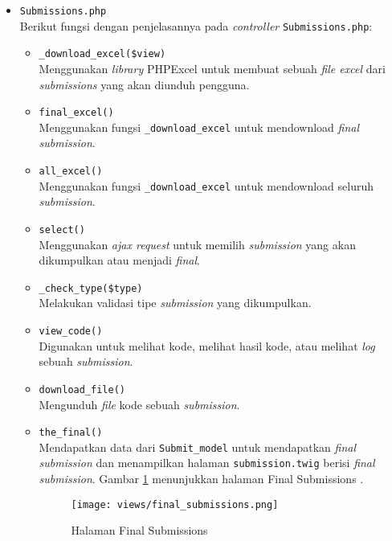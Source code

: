 \begin{itemize}
\begin{itemize}
	      \end{itemize}

	\item \verb|Submissions.php| \\
	      Berikut fungsi dengan penjelasannya pada \textit{controller} \verb|Submissions.php|:

	      \begin{itemize}
		      \item \verb|_download_excel($view)| \\
		            Menggunakan \textit{library} PHPExcel untuk membuat sebuah \textit{file excel} dari \textit{submissions} yang akan diunduh pengguna.
		      \item \verb|final_excel()| \\
		            Menggunakan fungsi \verb|_download_excel| untuk mendownload \textit{final submission}.
		      \item \verb|all_excel()| \\
		            Menggunakan fungsi \verb|_download_excel| untuk mendownload seluruh \textit{submission}.
		      \item \verb|select()| \\
		            Menggunakan \textit{ajax request} untuk memilih \textit{submission} yang akan dikumpulkan atau menjadi \textit{final}.
		      \item \verb|_check_type($type)| \\
		            Melakukan validasi tipe \textit{submission} yang dikumpulkan.
		      \item \verb|view_code()| \\
		            Digunakan untuk melihat kode, melihat hasil kode, atau melihat \textit{log} sebuah \textit{submission}.
		      \item \verb|download_file()| \\
		            Mengunduh \textit{file} kode sebuah \textit{submission}.
		      \item \verb|the_final()| \\
		            Mendapatkan data dari \verb|Submit_model| untuk mendapatkan \textit{final submission} dan menampilkan halaman \verb|submission.twig| berisi \textit{final submission}. Gambar \ref{fig:3:1:1:final} menunjukkan halaman Final Submissions .
		            \begin{figure}[H]
			            \centering
			            \texttt{[image: views/final\_submissions.png]}
			            \caption{Halaman Final Submissions}
			            \label{fig:3:1:1:final}
		            \end{figure}


\end{itemize}
\end{itemize}
